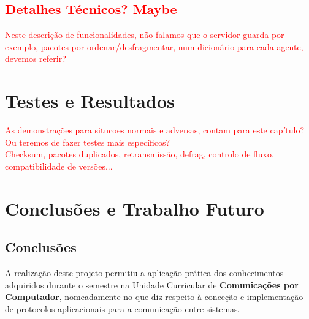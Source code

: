 \documentclass[a4paper,12pt]{scrreprt}
\begin{document}
\section{\textcolor{red}{Detalhes Técnicos? Maybe}}

\textcolor{red}{
    Neste descrição de funcionalidades, não falamos que o servidor guarda por exemplo,
    pacotes por ordenar/desfragmentar, num dicionário para cada agente, devemos referir?
}



\chapter{Testes e Resultados}

\textcolor{red}{
    As demonstrações para situcoes normais e adversas, contam para este capítulo?
    Ou teremos de fazer testes mais específicos? \\
    Checksum, pacotes duplicados, retransmissão, defrag, controlo de fluxo, compatibilidade de versões...
}



\chapter{Conclusões e Trabalho Futuro}

\section{Conclusões}

A realização deste projeto permitiu a aplicação prática dos conhecimentos adquiridos
durante o semestre na Unidade Curricular de \textbf{Comunicações por Computador},
nomeadamente no que diz respeito à conceção e implementação de protocolos aplicacionais
para a comunicação entre sistemas. 
\end{document}
